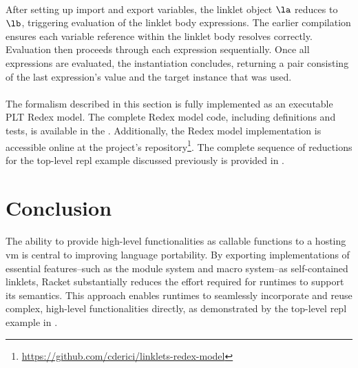 		\paragraph{}%
			After setting up import and export variables, the linklet object $\la$ reduces to $\lb$, triggering evaluation of the linklet body expressions. The earlier compilation ensures each variable reference within the linklet body resolves correctly. Evaluation then proceeds through each expression sequentially. Once all expressions are evaluated, the instantiation concludes, returning a pair consisting of the last expression's value and the target instance that was used.

		\paragraph{}%
			The formalism described in this section is fully implemented as an executable PLT Redex model. The complete Redex model code, including definitions and tests, is available in the . Additionally, the Redex model implementation is accessible online at the project's repository\footnote{\url{https://github.com/cderici/linklets-redex-model}}. The complete sequence of reductions for the top-level \gls{repl} example discussed previously is provided in .

	\section*{\thesection\quad Conclusion}

		\paragraph{}%
			The ability to provide high-level functionalities as callable functions to a hosting \gls{vm} is central to improving language portability. By exporting implementations of essential features--such as the module system and macro system--as self-contained linklets, Racket substantially reduces the effort required for runtimes to support its semantics. This approach enables runtimes to seamlessly incorporate and reuse complex, high-level functionalities directly, as demonstrated by the top-level \gls{repl} example in .

